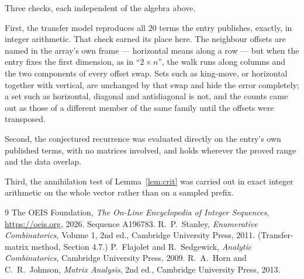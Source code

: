 \documentclass[11pt,a4paper]{article}
\theoremstyle{plain}
\theoremstyle{definition}
\begin{document}
Three checks, each independent of the algebra above.

First, the transfer model reproduces all $20$ terms the entry publishes, exactly, in
integer arithmetic. That check earned its place here. The neighbour offsets are named in the
array's own frame --- horizontal means along a row --- but when the entry fixes the first
dimension, as in ``$2\times n$'', the walk runs along columns and the two components of every
offset swap. Sets such as king-move, or horizontal together with vertical, are unchanged by
that swap and hide the error completely; a set such as horizontal, diagonal and antidiagonal
is not, and the counts came out as those of a different member of the same family until the
offsets were transposed.

Second, the conjectured recurrence was evaluated directly on the entry's own published terms,
with no matrices involved, and holds wherever the proved range and the data overlap.

Third, the annihilation test of Lemma~\ref{lem:crit} was carried out in exact integer
arithmetic on the whole vector rather than on a sampled prefix.

\begin{thebibliography}{9}
 The OEIS Foundation, \emph{The On-Line Encyclopedia of Integer
Sequences}, \url{https://oeis.org}, 2026. Sequence A196783.
 R.~P.~Stanley, \emph{Enumerative Combinatorics}, Volume 1, 2nd ed.,
Cambridge University Press, 2011. (Transfer-matrix method, Section 4.7.)
 P.~Flajolet and R.~Sedgewick, \emph{Analytic Combinatorics}, Cambridge
University Press, 2009.
 R.~A.~Horn and C.~R.~Johnson, \emph{Matrix Analysis}, 2nd ed., Cambridge
University Press, 2013.
\end{thebibliography}
\end{document}
